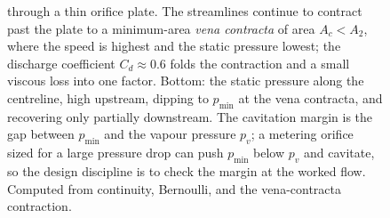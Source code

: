 \begin{figure}[htbp]
{through a thin orifice plate. The streamlines continue to contract
past the plate to a minimum-area \emph{vena contracta} of area
$A_c<A_2$, where the speed is highest and the static pressure lowest;
the discharge coefficient $C_d\approx0.6$ folds the contraction and a
small viscous loss into one factor. Bottom: the static pressure along
the centreline, high upstream, dipping to $p_{\min}$ at the vena
contracta, and recovering only partially downstream. The cavitation
margin is the gap between $p_{\min}$ and the vapour pressure $p_v$; a
metering orifice sized for a large pressure drop can push $p_{\min}$
below $p_v$ and cavitate, so the design discipline is to check the
margin at the worked flow. Computed from continuity, Bernoulli, and
the vena-contracta contraction.}
\label{fig:vol03ch11:orifice-vena-contracta}
\end{figure}
